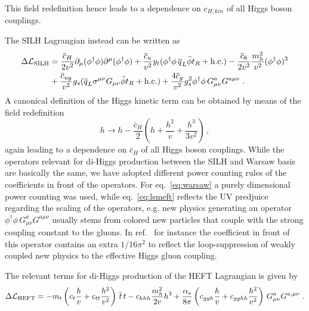 This field redefinition hence leads to a dependence on $c_{H,kin}$ of all Higgs boson couplings.
\par
The SILH Lagrangian instead can be written as
\begin{align}\label{eq:lsmeft}
	\Delta{\cal L}_{\text{SILH}} &=
	\frac{\bar c_H}{2 v^2}\partial_\mu(\phi^\dagger\phi)\partial^\mu(\phi^\dagger\phi)
	+\frac{\bar c_u}{v^2} y_t(\phi^\dagger\phi\, \bar q_L\tilde\phi t_R +{\rm h.c.})
	-\frac{\bar c_6}{2 v^2}\frac{m^2_h}{v^2} (\phi^\dagger\phi)^3
	\nonumber\\
	&+\frac{\bar c_{ug}}{v^2} g_s
	(\bar q_L\sigma^{\mu\nu}G_{\mu\nu}\tilde\phi t_R +{\rm h.c.})
	+\frac{4\bar c_g}{v^2} g^2_s \phi^\dagger\phi\, G^a_{\mu\nu}G^{a\mu\nu}\;.
\end{align}
A canonical definition of the Higgs kinetic term can be obtained by means of the field redefinition
\begin{equation}
	h \to h - \frac{\bar{c}_{H}}{2}\left( h +\frac{h^2}{v}+\frac{h^3}{3v^2}\right)\,, \label{fieldrefSILH}
\end{equation}
again leading to a dependence on $\bar{c}_H$ of all Higgs boson couplings.
While the operators relevant for di-Higgs production between the SILH and Warsaw basis are basically the same, we have adopted different power counting rules of the coefficients in front of the operators.  For eq.~\eqref{eq:warsaw} a purely dimensional power counting was used, while eq.~\eqref{eq:lsmeft}  reflects the UV predjuice regarding the scaling of the operators, e.g. new physics generating an operator $\phi^\dagger\phi\, G^a_{\mu\nu}G^{a\mu\nu}$ usually stems from colored new particles that couple with the strong coupling constant to the gluons. In ref.~\cite{Giudice:2007fh} for instance the coefficient in front of this operator contains an extra $1/16\pi^2$ to reflect the loop-suppression of weakly coupled new physics to the effective Higgs gluon coupling. 
\par
The relevant terms for di-Higgs production of the HEFT Lagrangian is given by
\begin{align}
	\Delta{\cal L}_{\text{HEFT}}=
	-m_t\left(c_t\frac{h}{v}+c_{tt}\frac{h^2}{v^2}\right)\,\bar{t}\,t -
	c_{hhh} \frac{m_h^2}{2v} h^3+\frac{\alpha_s}{8\pi} \left( c_{ggh} \frac{h}{v}+
	c_{gghh}\frac{h^2}{v^2}  \right)\, G^a_{\mu \nu} G^{a,\mu \nu}\;.
	\label{eq:ewchl}
\end{align}
